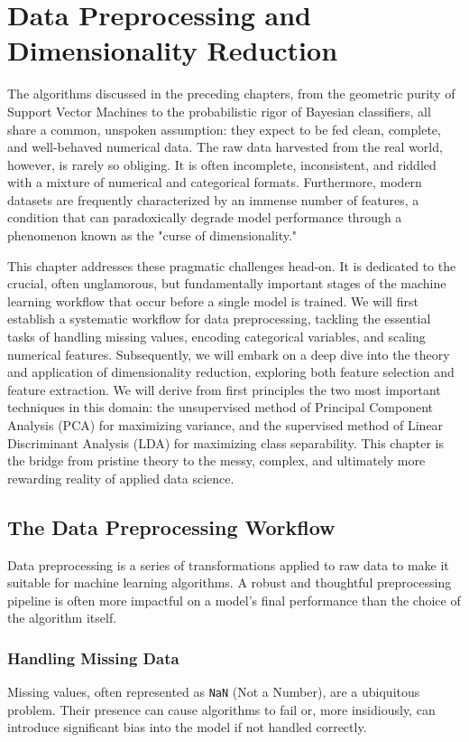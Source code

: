 \chapter{Data Preprocessing and Dimensionality Reduction}
\label{chap:preprocessing_and_dimensionality_reduction}

The algorithms discussed in the preceding chapters, from the geometric purity of Support Vector Machines to the probabilistic rigor of Bayesian classifiers, all share a common, unspoken assumption: they expect to be fed clean, complete, and well-behaved numerical data. The raw data harvested from the real world, however, is rarely so obliging. It is often incomplete, inconsistent, and riddled with a mixture of numerical and categorical formats. Furthermore, modern datasets are frequently characterized by an immense number of features, a condition that can paradoxically degrade model performance through a phenomenon known as the "curse of dimensionality."

This chapter addresses these pragmatic challenges head-on. It is dedicated to the crucial, often unglamorous, but fundamentally important stages of the machine learning workflow that occur before a single model is trained. We will first establish a systematic workflow for data preprocessing, tackling the essential tasks of handling missing values, encoding categorical variables, and scaling numerical features. Subsequently, we will embark on a deep dive into the theory and application of dimensionality reduction, exploring both feature selection and feature extraction. We will derive from first principles the two most important techniques in this domain: the unsupervised method of Principal Component Analysis (PCA) for maximizing variance, and the supervised method of Linear Discriminant Analysis (LDA) for maximizing class separability. This chapter is the bridge from pristine theory to the messy, complex, and ultimately more rewarding reality of applied data science.

\section{The Data Preprocessing Workflow}
\label{sec:preprocessing_workflow}
Data preprocessing is a series of transformations applied to raw data to make it suitable for machine learning algorithms. A robust and thoughtful preprocessing pipeline is often more impactful on a model's final performance than the choice of the algorithm itself.

\subsection{Handling Missing Data}
\label{subsec:missing_data}
Missing values, often represented as \texttt{NaN} (Not a Number), are a ubiquitous problem. Their presence can cause algorithms to fail or, more insidiously, can introduce significant bias into the model if not handled correctly.

